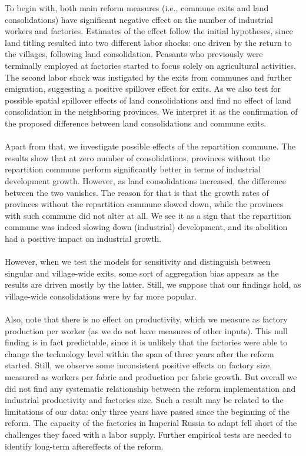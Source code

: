 \documentclass[a4paper, 12pt]{article}
\begin{document}
\noindent To begin with, both main reform measures (i.e., commune exits and land consolidations) have significant negative effect on the number of industrial workers and factories. Estimates of the effect follow the initial hypotheses, since land titling resulted into two different labor shocks: one driven by the return to the villages, following land consolidation. Peasants who previously were terminally employed at factories started to focus solely on agricultural activities. The second  labor shock was instigated by the exits from communes and further emigration, suggesting a positive spillover effect for exits. As we also  test for possible spatial spillover effects of land consolidations and find no effect of land consolidation in the neighboring provinces. We interpret it as the confirmation of the proposed difference between land consolidations and commune exits.
\\\\
\noindent Apart from that, we investigate possible effects of the repartition commune. The results show that at zero number of consolidations, provinces without the repartition commune perform significantly better in terms of industrial development growth. However, as land consolidations increased, the difference between the two vanishes. The reason for that is that the growth rates of provinces without the repartition commune slowed down, while the provinces with such commune did not alter at all. We see it as a sign that the repartition commune was indeed slowing down (industrial) development, and its abolition had a positive impact on industrial growth. %
\\\\
\noindent However, when we test the models for sensitivity and distinguish between singular and village-wide exits, some sort of aggregation bias appears as the results are driven mostly by the latter. Still, we suppose that our findings hold, as village-wide consolidations were by far more popular. 
\\\\
\noindent Also, note that there is no effect on productivity, which we measure as factory production per worker (as we do not have measures of other inputs). This null finding is in fact predictable, since it is unlikely that the factories were able to change the technology level within the span of three years after the reform started. Still, we observe some inconsistent positive effects on factory size, measured as workers per fabric and production per fabric growth. But overall we did not find any systematic relationship between the reform implementation and industrial productivity and factories size. Such a result may be related to the limitations of our data:  only three years have passed since the beginning of the reform. The capacity of the factories in Imperial Russia to adapt fell short of the challenges they faced with a labor supply.  Further empirical tests are needed to identify long-term aftereffects of the reform.
\end{document}
